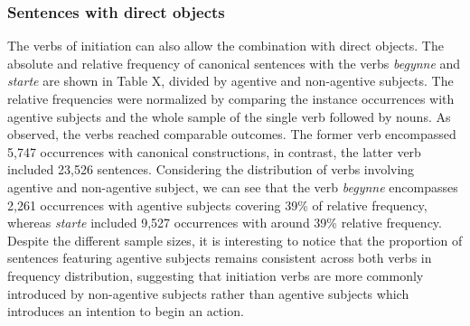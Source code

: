 \documentclass{article}
\begin{document}
\subsubsection{Sentences with direct objects} %

The verbs of initiation can also allow the combination with direct objects. The absolute and relative frequency of canonical sentences with the verbs \emph{begynne} and \emph{starte} are shown in Table X, divided by agentive and non-agentive subjects. The relative frequencies were normalized by comparing the instance occurrences with agentive subjects and the whole sample of the single verb followed by nouns.
As observed, the verbs reached comparable outcomes. The former verb encompassed 5,747 occurrences with canonical constructions, in contrast, the latter verb included 23,526 sentences.
Considering the distribution of verbs involving agentive and non-agentive subject, we can see that the verb \emph{begynne} encompasses 2,261 occurrences with agentive subjects covering 39\% of relative frequency, whereas \emph{starte} included 9,527 occurrences with around 39\% relative frequency. 
Despite the different sample sizes, it is interesting to notice that  the proportion of sentences featuring agentive subjects remains consistent across both verbs in frequency distribution, suggesting that initiation verbs are more commonly introduced by non-agentive subjects rather than agentive subjects which introduces an intention to begin an action. 
\end{document}
